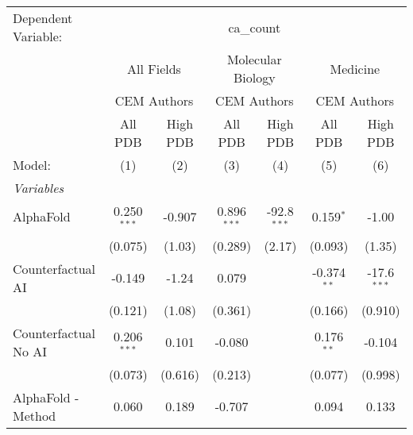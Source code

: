\begingroup
\centering
\begin{tabular}{lcccccc}
   \tabularnewline \midrule \midrule
   Dependent Variable: & \multicolumn{6}{c}{ca\_count}\\
 & \multicolumn{2}{c}{All Fields} & \multicolumn{2}{c}{Molecular Biology} & \multicolumn{2}{c}{Medicine} \\
\cmidrule(lr){2-3} \cmidrule(lr){4-5} \cmidrule(lr){6-7}
 & \multicolumn{2}{c}{CEM Authors} & \multicolumn{2}{c}{CEM Authors} & \multicolumn{2}{c}{CEM Authors} \\
\cmidrule(lr){2-3} \cmidrule(lr){4-5} \cmidrule(lr){6-7}
 & \multicolumn{1}{c}{All PDB} & \multicolumn{1}{c}{High PDB} & \multicolumn{1}{c}{All PDB} & \multicolumn{1}{c}{High PDB} & \multicolumn{1}{c}{All PDB} & \multicolumn{1}{c}{High PDB} \\
\cmidrule(lr){2-2} \cmidrule(lr){3-3} \cmidrule(lr){4-4} \cmidrule(lr){5-5} \cmidrule(lr){6-6} \cmidrule(lr){7-7}
   Model:                                                     & (1)           & (2)           & (3)           & (4)           & (5)           & (6)\\  
   \midrule
   \emph{Variables}\\
   AlphaFold                                                  & 0.250$^{***}$ & -0.907        & 0.896$^{***}$ & -92.8$^{***}$ & 0.159$^{*}$   & -1.00\\   
                                                              & (0.075)       & (1.03)        & (0.289)       & (2.17)        & (0.093)       & (1.35)\\   
   Counterfactual AI                                          & -0.149        & -1.24         & 0.079         &               & -0.374$^{**}$ & -17.6$^{***}$\\   
                                                              & (0.121)       & (1.08)        & (0.361)       &               & (0.166)       & (0.910)\\   
   Counterfactual No AI                                       & 0.206$^{***}$ & 0.101         & -0.080        &               & 0.176$^{**}$  & -0.104\\   
                                                              & (0.073)       & (0.616)       & (0.213)       &               & (0.077)       & (0.998)\\   
   AlphaFold - Method                                         & 0.060         & 0.189         & -0.707        &               & 0.094         & 0.133\\   

\end{tabular}

